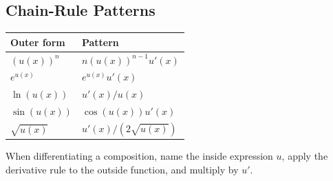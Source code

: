 \subsection*{Chain-Rule Patterns}

\begin{center}
\begin{tabular}{ll}
\toprule
Outer form & Pattern \\
\midrule
\((u(x))^n\) & \(n(u(x))^{n-1}u'(x)\) \\
\(e^{u(x)}\) & \(e^{u(x)}u'(x)\) \\
\(\ln(u(x))\) & \(u'(x)/u(x)\) \\
\(\sin(u(x))\) & \(\cos(u(x))u'(x)\) \\
\(\sqrt{u(x)}\) & \(u'(x)/(2\sqrt{u(x)})\) \\
\bottomrule
\end{tabular}
\end{center}

\begin{remark*}[Method]
When differentiating a composition, name the inside expression \(u\), apply
the derivative rule to the outside function, and multiply by \(u'\).
\end{remark*}
